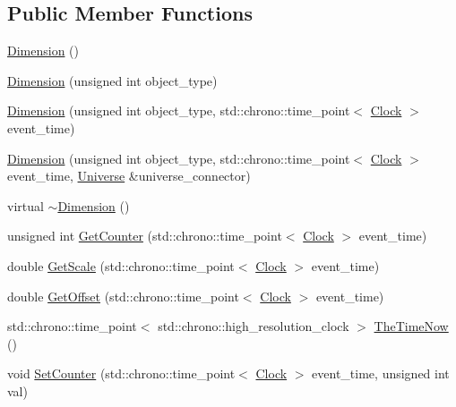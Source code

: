 \subsection*{Public Member Functions}
\begin{DoxyCompactItemize}
\item 
\mbox{\hyperlink{classDimension_aa61dad15f33b6c3d09028ba9e545aa70}{Dimension}} ()
\item 
\mbox{\hyperlink{classDimension_a68def81e037c1bcc005591f45c53e3a3}{Dimension}} (unsigned int object\+\_\+type)
\item 
\mbox{\hyperlink{classDimension_ab48cbe6ca22404ab5a2c522498c38d7c}{Dimension}} (unsigned int object\+\_\+type, std\+::chrono\+::time\+\_\+point$<$ \mbox{\hyperlink{universe_8h_a0ef8d951d1ca5ab3cfaf7ab4c7a6fd80}{Clock}} $>$ event\+\_\+time)
\item 
\mbox{\hyperlink{classDimension_a9282c4669e8f97dce010324886d79a99}{Dimension}} (unsigned int object\+\_\+type, std\+::chrono\+::time\+\_\+point$<$ \mbox{\hyperlink{universe_8h_a0ef8d951d1ca5ab3cfaf7ab4c7a6fd80}{Clock}} $>$ event\+\_\+time, \mbox{\hyperlink{classUniverse}{Universe}} \&universe\+\_\+connector)
\item 
virtual \mbox{\hyperlink{classDimension_aa990dfd442020c193a1941e9dffbfbee}{$\sim$\+Dimension}} ()
\item 
unsigned int \mbox{\hyperlink{classDimension_a2fbee64eeea5de3d8eab10cf0fdb6363}{Get\+Counter}} (std\+::chrono\+::time\+\_\+point$<$ \mbox{\hyperlink{universe_8h_a0ef8d951d1ca5ab3cfaf7ab4c7a6fd80}{Clock}} $>$ event\+\_\+time)
\item 
double \mbox{\hyperlink{classDimension_a6985e3d8738202530cb2cd428b5b884c}{Get\+Scale}} (std\+::chrono\+::time\+\_\+point$<$ \mbox{\hyperlink{universe_8h_a0ef8d951d1ca5ab3cfaf7ab4c7a6fd80}{Clock}} $>$ event\+\_\+time)
\item 
double \mbox{\hyperlink{classDimension_a58009cd435ead4b7b2f395a11fda0ae8}{Get\+Offset}} (std\+::chrono\+::time\+\_\+point$<$ \mbox{\hyperlink{universe_8h_a0ef8d951d1ca5ab3cfaf7ab4c7a6fd80}{Clock}} $>$ event\+\_\+time)
\item 
std\+::chrono\+::time\+\_\+point$<$ std\+::chrono\+::high\+\_\+resolution\+\_\+clock $>$ \mbox{\hyperlink{classDimension_ab39b7ff253ade59c5c2d807c511b4028}{The\+Time\+Now}} ()
\item 
void \mbox{\hyperlink{classDimension_a75c6a1a1e09c40b5860dc11a83384d9f}{Set\+Counter}} (std\+::chrono\+::time\+\_\+point$<$ \mbox{\hyperlink{universe_8h_a0ef8d951d1ca5ab3cfaf7ab4c7a6fd80}{Clock}} $>$ event\+\_\+time, unsigned int val)

\end{DoxyCompactItemize}
